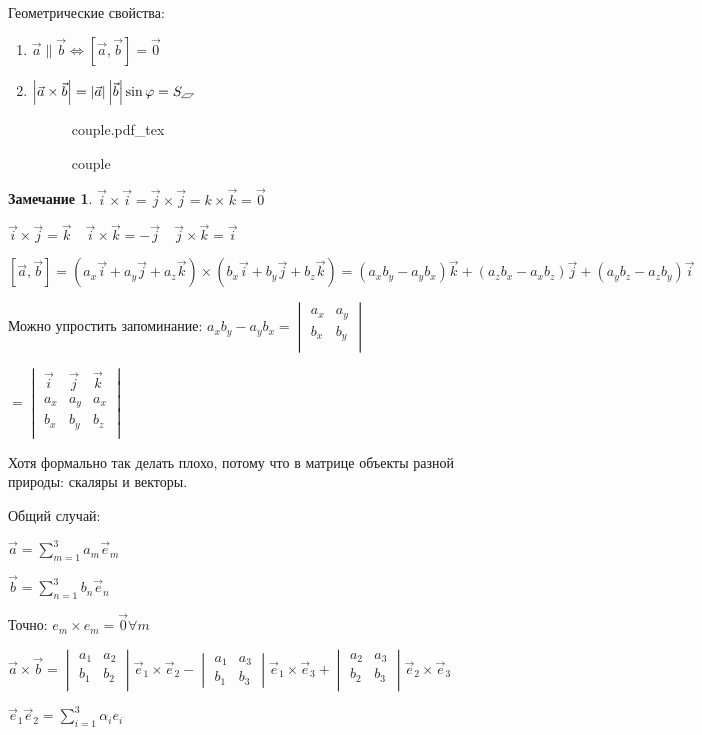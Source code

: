 \documentclass{book}
\theoremstyle{definition}
\newtheorem*{note}{Замечание}
\newcommand{\incfig}[1]{%
    \def\svgwidth{\columnwidth}
    {#1.pdf_tex}
}
\begin{document}
 Геометрические свойства:
 \begin{enumerate}
     \item $\vec a \parallel \vec b \Longleftrightarrow \left[ \vec a, \vec b \right] = \vec 0 $ 
     \item $\left| \vec a \times \vec b \right| = \left| \vec a \right| \left| \vec b \right| \sin \varphi  = S_{\tikz[scale=0.1] \draw (0,0) -- (1,1) -- (3,1) -- (2,0) -- cycle;}$

\begin{figure}[ht]
    \centering
    \incfig{couple}
    \caption{couple}
    \label{fig:couple}
\end{figure}
 \end{enumerate}

 \begin{note}
     $\vec i \times  \vec i = \vec j \times \vec j = k \times \vec k = \vec 0$
     
     $\vec i \times \vec j = \vec k\quad \vec i \times  \vec k = -\vec j\quad \vec j\times  \vec k = \vec i$

     $[\vec a, \vec b] = (a_x\vec i + a_y\vec j + a_z\vec k) \times (b_x\vec i + b_y\vec j + b_z\vec k) = (a_xb_y - a_yb_x)\vec k + (a_zb_x-a_xb_z)\vec j  + (a_yb_z - a_zb_y)\vec i$

     Можно упростить запоминание: $a_xb_y-a_yb_x = 
     \begin{vmatrix}
         a_x&a_y\\
         b_x&b_y\\
     \end{vmatrix}$ 

     $=
     \begin{vmatrix}
         \vec i & \vec j & \vec k\\
         a_x & a_y & a_x\\
         b_x & b_y & b_z\\
     \end{vmatrix}$

     Хотя формально так делать плохо, потому что в матрице объекты разной природы: скаляры и векторы.
 \end{note}

Общий случай: 

$\vec a = \sum_{m=1}^{3} a_m\vec e_m$

$\vec b = \sum_{n=1}^{3} b_n\vec e_n$

Точно: $e_m \times  e_m = \vec 0 \forall m$

$\vec a \times  \vec b = 
\begin{vmatrix}
    a_1 & a_2\\ b_1 & b_2\\
\end{vmatrix} \vec e_1 \times \vec e_2 - 
\begin{vmatrix}
    a_1 & a_3\\ b_1 & b_3
\end{vmatrix} \vec e_1\times  \vec e_3 + 
\begin{vmatrix}
    a_2 & a_3\\ b_2 & b_3\\
\end{vmatrix} \vec e_2 \times \vec e_3$

$\vec e_1\vec e_2 = \sum_{i=1}^{3} \alpha_ie_i$
\end{document}
